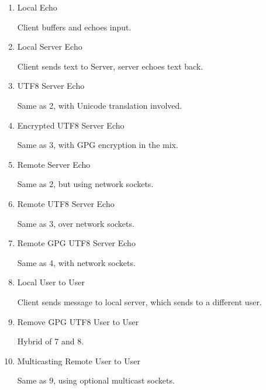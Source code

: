 
\begin{table}[H]

\begin{center}

\begin{enumerate}


\item Local Echo 

	\subitem Client buffers and echoes input.

\item Local Server Echo 

	\subitem Client sends text to Server, server echoes text back.

\item UTF8 Server Echo 

	\subitem Same as 2, with Unicode translation involved.

\item Encrypted UTF8 Server Echo 

	\subitem Same as 3, with GPG encryption in the mix.

\item Remote Server Echo 

	\subitem Same as 2, but using network sockets.

\item Remote UTF8 Server Echo 

	\subitem Same as 3, over network sockets.

\item Remote GPG UTF8 Server Echo 

	\subitem Same as 4, with network sockets.

\item Local User to User 

	\subitem Client sends message to local server, which sends to a 
	different user.

\item Remove GPG UTF8 User to User 

	\subitem Hybrid of 7 and 8.

\item Multicasting Remote User to User 

	\subitem Same as 9, using optional multicast sockets.

\end{enumerate}

\end{center}

\caption{List of Initial Milestones}

\end{table}
